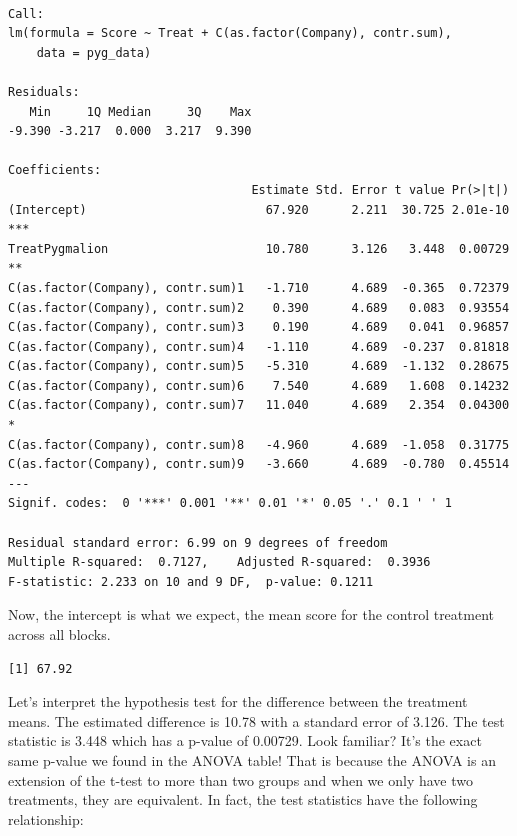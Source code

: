 \documentclass[
  letterpaper,
]{book}
\newenvironment{Shaded}{\begin{snugshade}}{\end{snugshade}}
\newcommand{\FunctionTok}[1]{\textcolor[rgb]{0.13,0.29,0.53}{\textbf{#1}}}
\newcommand{\NormalTok}[1]{#1}
\newcommand{\SpecialCharTok}[1]{\textcolor[rgb]{0.81,0.36,0.00}{\textbf{#1}}}
\newcommand{\StringTok}[1]{\textcolor[rgb]{0.31,0.60,0.02}{#1}}
\begin{document}
\begin{verbatim}

Call:
lm(formula = Score ~ Treat + C(as.factor(Company), contr.sum), 
    data = pyg_data)

Residuals:
   Min     1Q Median     3Q    Max 
-9.390 -3.217  0.000  3.217  9.390 

Coefficients:
                                  Estimate Std. Error t value Pr(>|t|)    
(Intercept)                         67.920      2.211  30.725 2.01e-10 ***
TreatPygmalion                      10.780      3.126   3.448  0.00729 ** 
C(as.factor(Company), contr.sum)1   -1.710      4.689  -0.365  0.72379    
C(as.factor(Company), contr.sum)2    0.390      4.689   0.083  0.93554    
C(as.factor(Company), contr.sum)3    0.190      4.689   0.041  0.96857    
C(as.factor(Company), contr.sum)4   -1.110      4.689  -0.237  0.81818    
C(as.factor(Company), contr.sum)5   -5.310      4.689  -1.132  0.28675    
C(as.factor(Company), contr.sum)6    7.540      4.689   1.608  0.14232    
C(as.factor(Company), contr.sum)7   11.040      4.689   2.354  0.04300 *  
C(as.factor(Company), contr.sum)8   -4.960      4.689  -1.058  0.31775    
C(as.factor(Company), contr.sum)9   -3.660      4.689  -0.780  0.45514    
---
Signif. codes:  0 '***' 0.001 '**' 0.01 '*' 0.05 '.' 0.1 ' ' 1

Residual standard error: 6.99 on 9 degrees of freedom
Multiple R-squared:  0.7127,    Adjusted R-squared:  0.3936 
F-statistic: 2.233 on 10 and 9 DF,  p-value: 0.1211
\end{verbatim}

Now, the intercept is what we expect, the mean score for the control
treatment across all blocks.

\begin{Shaded}
\end{Shaded}

\begin{verbatim}
[1] 67.92
\end{verbatim}

Let's interpret the hypothesis test for the difference between the
treatment means. The estimated difference is 10.78 with a standard error
of 3.126. The test statistic is 3.448 which has a p-value of 0.00729.
Look familiar? It's the exact same p-value we found in the ANOVA table!
That is because the ANOVA is an extension of the t-test to more than two
groups and when we only have two treatments, they are equivalent. In
fact, the test statistics have the following relationship:
\end{document}
